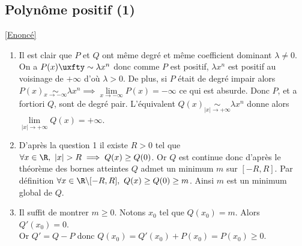 \documentclass{book}
\begin{document}
	\subsection{Polynôme positif (1) }
	\label{sec:polynôme-positif-(1)}
	\textcolor{blue}{\hyperref[Polynôme positif (1)]{[Enoncé]}}\\
	\begin{enumerate}[leftmargin=*]
		\item Il est clair que $P$ et $Q$ ont même degré et même coefficient dominant $\lambda\ne 0$. On a $P(x)\uxfty\sim\lambda x^n$ donc comme $P$ est positif, $\lambda x^n$ est positif au voisinage de $+\infty$ d'où $\lambda>0$. De plus, si $P$ était de degré impair alors $P(x)\underset{x\to-\infty}{\sim}\lambda x^n\implies \lim\limits_{x\to-\infty}P(x)=-\infty$ ce qui est absurde. Donc $P$, et a fortiori $Q$, sont de degré pair. L'équivalent $Q(x)\underset{|x|\to+\infty}{\sim}\lambda x^n$ donne alors $\lim\limits_{|x|\to+\infty} Q(x)=+\infty$.
		\item D'après la question 1 il existe $R>0$ tel que $\forall x\in \R,\ |x|>R\implies Q(x)\geq Q(0)$. Or $Q$ est continue donc d'après le théorème des bornes atteintes $Q$ admet un minimum $m$ sur $[-R,R]$. Par définition $\forall x\in \R\backslash[-R,R],\ Q(x)\geq Q(0)\geq m$. Ainsi $m$ est un minimum global de $Q$.
		\item Il suffit de montrer $m\geq 0$. Notons $x_0$ tel que $Q(x_0)=m$. Alors $Q'(x_0)=0$.\\
		Or $Q'=Q-P$ donc $Q(x_0)=Q'(x_0)+P(x_0)=P(x_0)\geq 0$.
	\end{enumerate}
	
\end{document}
